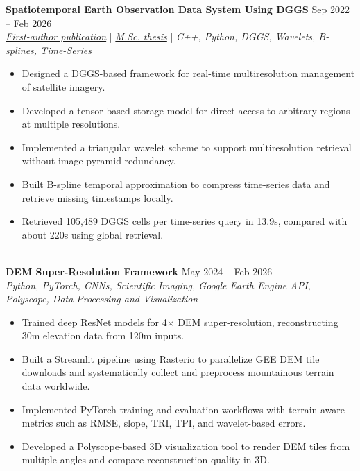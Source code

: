 \documentclass[a4paper,10pt]{article}
\begin{document}
\noindent
\textbf{Spatiotemporal Earth Observation Data System Using DGGS} \hfill Sep 2022 -- Feb 2026 \\
\textit{\href{https://doi.org/10.3390/rs17040570}{First-author publication}} | \textit{\href{https://ucalgary.scholaris.ca/items/114b394b-e516-4732-bd3a-45dd6160d480}{M.Sc. thesis}} | \textit{C++, Python, DGGS, Wavelets, B-splines, Time-Series}
\begin{itemize}[leftmargin=0.25in]
    \item Designed a DGGS-based framework for real-time multiresolution management of satellite imagery.
    \item Developed a tensor-based storage model for direct access to arbitrary regions at multiple resolutions.
    \item Implemented a triangular wavelet scheme to support multiresolution retrieval without image-pyramid redundancy.
    \item Built B-spline temporal approximation to compress time-series data and retrieve missing timestamps locally.
    \item Retrieved 105,489 DGGS cells per time-series query in 13.9s, compared with about 220s using global retrieval.
\end{itemize}

\noindent \\
\textbf{DEM Super-Resolution Framework} \hfill May 2024 -- Feb 2026 \\
\textit{Python, PyTorch, CNNs, Scientific Imaging, Google Earth Engine API, Polyscope, Data Processing and Visualization}
\begin{itemize}[leftmargin=0.25in]
    \item Trained deep ResNet models for 4$\times$ DEM super-resolution, reconstructing 30m elevation data from 120m inputs.
    \item Built a Streamlit pipeline using Rasterio to parallelize GEE DEM tile downloads and systematically collect and preprocess mountainous terrain data worldwide.
    \item Implemented PyTorch training and evaluation workflows with terrain-aware metrics such as RMSE, slope, TRI, TPI, and wavelet-based errors.
    \item Developed a Polyscope-based 3D visualization tool to render DEM tiles from multiple angles and compare reconstruction quality in 3D.
\end{itemize}
\end{document}

